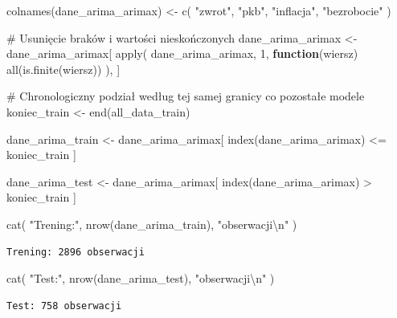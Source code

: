 \documentclass[
  polish,
  letterpaper,
  DIV=11,
  numbers=noendperiod]{scrartcl}
\newenvironment{Shaded}{\begin{snugshade}}{\end{snugshade}}
\newcommand{\CommentTok}[1]{\textcolor[rgb]{0.37,0.37,0.37}{#1}}
\newcommand{\ControlFlowTok}[1]{\textcolor[rgb]{0.00,0.23,0.31}{\textbf{#1}}}
\newcommand{\DecValTok}[1]{\textcolor[rgb]{0.68,0.00,0.00}{#1}}
\newcommand{\FunctionTok}[1]{\textcolor[rgb]{0.28,0.35,0.67}{#1}}
\newcommand{\NormalTok}[1]{\textcolor[rgb]{0.00,0.23,0.31}{#1}}
\newcommand{\OtherTok}[1]{\textcolor[rgb]{0.00,0.23,0.31}{#1}}
\newcommand{\SpecialCharTok}[1]{\textcolor[rgb]{0.37,0.37,0.37}{#1}}
\newcommand{\StringTok}[1]{\textcolor[rgb]{0.13,0.47,0.30}{#1}}
\begin{document}
\begin{Shaded}
\begin{Highlighting}[]
\FunctionTok{colnames}\NormalTok{(dane\_arima\_arimax) }\OtherTok{\textless{}{-}} \FunctionTok{c}\NormalTok{(}
  \StringTok{"zwrot"}\NormalTok{,}
  \StringTok{"pkb"}\NormalTok{,}
  \StringTok{"inflacja"}\NormalTok{,}
  \StringTok{"bezrobocie"}
\NormalTok{)}

\CommentTok{\# Usunięcie braków i wartości nieskończonych}
\NormalTok{dane\_arima\_arimax }\OtherTok{\textless{}{-}}\NormalTok{ dane\_arima\_arimax[}
  \FunctionTok{apply}\NormalTok{(}
\NormalTok{    dane\_arima\_arimax,}
    \DecValTok{1}\NormalTok{,}
    \ControlFlowTok{function}\NormalTok{(wiersz) }\FunctionTok{all}\NormalTok{(}\FunctionTok{is.finite}\NormalTok{(wiersz))}
\NormalTok{  ),}
\NormalTok{]}

\CommentTok{\# Chronologiczny podział według tej samej granicy co pozostałe modele}
\NormalTok{koniec\_train }\OtherTok{\textless{}{-}} \FunctionTok{end}\NormalTok{(all\_data\_train)}

\NormalTok{dane\_arima\_train }\OtherTok{\textless{}{-}}\NormalTok{ dane\_arima\_arimax[}
  \FunctionTok{index}\NormalTok{(dane\_arima\_arimax) }\SpecialCharTok{\textless{}=}\NormalTok{ koniec\_train}
\NormalTok{]}

\NormalTok{dane\_arima\_test }\OtherTok{\textless{}{-}}\NormalTok{ dane\_arima\_arimax[}
  \FunctionTok{index}\NormalTok{(dane\_arima\_arimax) }\SpecialCharTok{\textgreater{}}\NormalTok{ koniec\_train}
\NormalTok{]}

\FunctionTok{cat}\NormalTok{(}
  \StringTok{"Trening:"}\NormalTok{,}
  \FunctionTok{nrow}\NormalTok{(dane\_arima\_train),}
  \StringTok{"obserwacji}\SpecialCharTok{\textbackslash{}n}\StringTok{"}
\NormalTok{)}
\end{Highlighting}
\end{Shaded}

\begin{verbatim}
Trening: 2896 obserwacji
\end{verbatim}

\begin{Shaded}
\begin{Highlighting}[]
\FunctionTok{cat}\NormalTok{(}
  \StringTok{"Test:"}\NormalTok{,}
  \FunctionTok{nrow}\NormalTok{(dane\_arima\_test),}
  \StringTok{"obserwacji}\SpecialCharTok{\textbackslash{}n}\StringTok{"}
\NormalTok{)}
\end{Highlighting}
\end{Shaded}

\begin{verbatim}
Test: 758 obserwacji
\end{verbatim}
\end{document}
